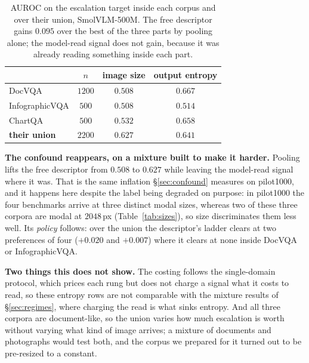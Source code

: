 \documentclass[10pt,twocolumn]{article}
\theoremstyle{plain}
\begin{document}
\begin{table}[t]
\centering\small
\setlength{\tabcolsep}{5pt}
\begin{tabular}{lccc}
\toprule
 & $n$ & image size & output entropy \\
\midrule
DocVQA & $1200$ & $0.508$ & $0.667$ \\
InfographicVQA & $500$ & $0.508$ & $0.514$ \\
ChartQA & $500$ & $0.532$ & $0.658$ \\
\midrule
\textbf{their union} & $2200$ & $\mathbf{0.627}$ & $0.641$ \\
\bottomrule
\end{tabular}
\caption{AUROC on the escalation target inside each corpus and over their
union, SmolVLM-500M. The free descriptor gains $0.095$ over the best of the
three parts by pooling alone; the model-read signal does not gain, because it
was already reading something inside each part.}
\label{tab:secondmix}
\end{table}

\textbf{The confound reappears, on a mixture built to make it harder.} Pooling
lifts the free descriptor from $0.508$ to $0.627$ while leaving the model-read
signal where it was. That is the same inflation \S\ref{sec:confound} measures on
pilot1000, and it happens here despite the label being degraded on purpose: in
pilot1000 the four benchmarks arrive at three distinct modal sizes, whereas two
of these three corpora are modal at $2048$\,px (Table~\ref{tab:sizes}), so size
discriminates them less well. Its \emph{policy} follows: over the union the
descriptor's ladder clears at two preferences of four ($+0.020$ and $+0.007$)
where it clears at none inside DocVQA or InfographicVQA.

\textbf{Two things this does not show.} The costing follows the single-domain
protocol, which prices each rung but does not charge a signal what it costs to
read, so these entropy rows are not comparable with the mixture results of
\S\ref{sec:regimes}, where charging the read is what sinks entropy. And all
three corpora are document-like, so the union varies how much escalation is
worth without varying what kind of image arrives; a mixture of documents and
photographs would test both, and the corpus we prepared for it turned out to be
pre-resized to a constant.
\end{document}
